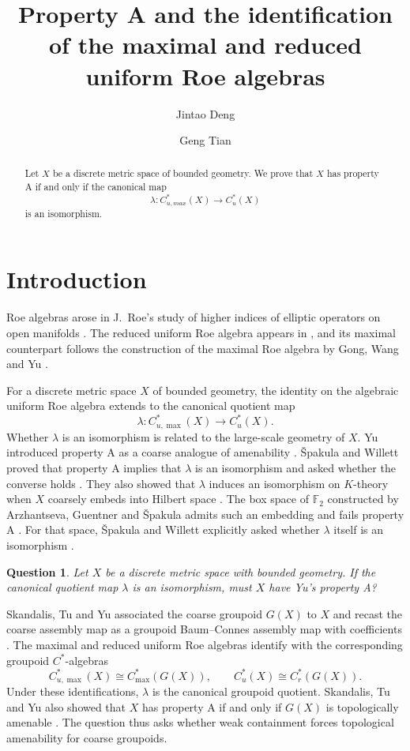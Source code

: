 \documentclass[11pt,a4paper]{article}
\title{Property A and the identification of the maximal and reduced uniform Roe algebras}
\author{Jintao Deng \and Geng Tian}
\date{}
\newtheorem{question}[theorem]{Question}
\theoremstyle{definition}\newtheorem{definition}[theorem]{Definition}
\theoremstyle{remark}\newtheorem{remark}[theorem]{Remark}
\newcommand{\Cu}{C_u^*}
\newcommand{\Cum}{C_{u,\max}^*}
\begin{document}
\maketitle
\onehalfspacing


\begin{abstract}
Let $X$ be a discrete metric space of bounded geometry. We prove that
$X$ has property A if and only if the canonical map 
$$\lambda:C^*_{u,max}(X)\to C^*_u(X)$$
is an isomorphism.
\end{abstract}

\section{Introduction}

Roe algebras arose in J.~Roe's study of higher indices of elliptic
operators on open manifolds \cite{Roe88}. The reduced uniform
Roe algebra appears in \cite[Section 4.4]{Roe03}, and its maximal
counterpart follows the construction of the maximal Roe algebra by
Gong, Wang and Yu \cite[Sections 3--4]{GWY}.

For a discrete metric space $X$ of bounded geometry, the identity on
the algebraic uniform Roe algebra extends to the canonical quotient map
$$
\lambda:\Cum(X)\longrightarrow\Cu(X).
$$
Whether $\lambda$ is an isomorphism is related to the large-scale
geometry of $X$. Yu introduced property A as a coarse analogue of
amenability \cite{Yu}. \v{S}pakula and Willett proved that property A
implies that $\lambda$ is an isomorphism and asked whether the converse
holds \cite[Proposition 1.3 and Section 1]{SW}. They also showed that
$\lambda$ induces an isomorphism on $K$-theory when $X$ coarsely embeds
into Hilbert space \cite[Theorem 1.4]{SW}. The box space of $\mathbb F_2$
constructed by Arzhantseva, Guentner and \v{S}pakula admits such an
embedding and fails property A \cite{AGS}. For that space, \v{S}pakula
and Willett explicitly asked whether $\lambda$ itself is an isomorphism
\cite[Example 1.16]{SW}.

\begin{question}\label{mainquestionofthispaper}
Let $X$ be a discrete metric space with bounded geometry. If the canonical
quotient map $\lambda$ is an isomorphism, must $X$ have Yu's property A?
\end{question}

Skandalis, Tu and Yu associated the coarse groupoid $G(X)$ to $X$
and recast the coarse assembly map as a groupoid Baum--Connes assembly
map with coefficients \cite[Proposition 4.8]{STY}. The maximal and
reduced uniform Roe algebras identify with the corresponding groupoid
$C^*$-algebras \cite[Remark 1.5]{SW}
$$
\Cum(X)\cong C^*_{\max}(G(X)),\qquad
\Cu(X)\cong C^*_r(G(X)).
$$
Under these identifications, $\lambda$ is the canonical groupoid
quotient. Skandalis, Tu and Yu also showed that $X$ has property A
if and only if $G(X)$ is topologically amenable
\cite[Theorem 5.3]{STY}. The question thus asks whether weak
containment forces topological amenability for coarse groupoids.
\end{document}
